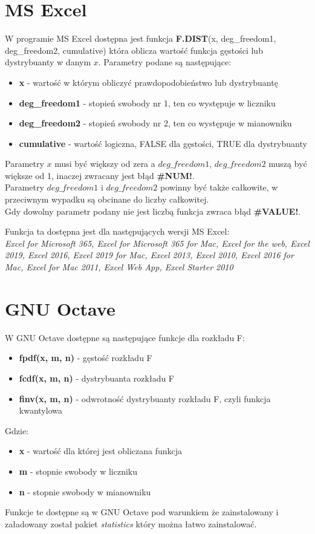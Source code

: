 \documentclass{article}
\begin{document}
{\section{MS Excel}
W programie MS Excel dostępna jest funkcja \textbf{F.DIST}(x, deg\_freedom1, deg\_freedom2, cumulative) która oblicza wartość funkcja gęstości lub dystrybuanty w danym $x$. Parametry podane są następujące:
\begin{itemize}
\item \textbf{x} - wartość w którym obliczyć prawdopodobieństwo lub dystrybuantę
\item \textbf{deg\_freedom1} - stopień swobody nr 1, ten co występuje w liczniku
\item \textbf{deg\_freedom2} - stopień swobody nr 2, ten co występuje w mianowniku
\item \textbf{cumulative} - wartość logiczna, FALSE dla gęstości, TRUE dla dystrybuanty
\end{itemize}
Parametry $x$ musi być większy od zera a $deg\_freedom1$, $deg\_freedom2$ muszą być większe od 1, inaczej zwracany jest błąd \textbf{\#NUM!}. \\
Parametry $deg\_freedom1$ i $deg\_freedom2$ powinny być także całkowite, w przeciwnym wypadku są obcinane do liczby całkowitej. \\
Gdy dowolny parametr podany nie jest liczbą funkcja zwraca błąd \textbf{\#VALUE!}. \\ \par
Funkcja ta dostępna jest dla następujących wersji MS Excel: \\
\textit{Excel for Microsoft 365, Excel for Microsoft 365 for Mac, Excel for the web, Excel 2019, Excel 2016, Excel 2019 for Mac, Excel 2013, Excel 2010, Excel 2016 for Mac, Excel for Mac 2011, Excel Web App, Excel Starter 2010}

\newpage
\section{GNU Octave}
W GNU Octave dostępne są następujące funkcje dla rozkładu F:
\begin{itemize}
\item \textbf{fpdf(x, m, n)} - gęstość rozkładu F
\item \textbf{fcdf(x, m, n)} - dystrybuanta rozkładu F
\item \textbf{finv(x, m, n)} - odwrotność dystrybuanty rozkładu F, czyli funkcja kwantylowa
\end{itemize}
Gdzie: 
\begin{itemize}
\item \textbf{x} - wartość dla której jest obliczana funkcja
\item \textbf{m} - stopnie swobody w liczniku
\item \textbf{n} - stopnie swobody w mianowniku
\end{itemize}
Funkcje te dostępne są w GNU Octave pod warunkiem że zainstalowany i załadowany został pakiet \textit{statistics} który można łatwo zainstalować.

}
\end{document}
